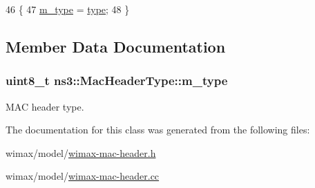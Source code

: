 \begin{DoxyCode}
46 \{
47   \hyperlink{classns3_1_1MacHeaderType_a20a811c2c0b8fa820f289ef3c578cb83}{m\_type} = \hyperlink{visualizer-ideas_8txt_add98db9e15e2a58cf2b57623e7aa893a}{type};
48 \}
\end{DoxyCode}


\subsection{Member Data Documentation}
\subsubsection[{\texorpdfstring{m\+\_\+type}{m_type}}]{\setlength{\rightskip}{0pt plus 5cm}uint8\+\_\+t ns3\+::\+Mac\+Header\+Type\+::m\+\_\+type\hspace{0.3cm}{\ttfamily [private]}}\hypertarget{classns3_1_1MacHeaderType_a20a811c2c0b8fa820f289ef3c578cb83}{}\label{classns3_1_1MacHeaderType_a20a811c2c0b8fa820f289ef3c578cb83}


M\+AC header type. 



The documentation for this class was generated from the following files\+:\begin{DoxyCompactItemize}
\item 
wimax/model/\hyperlink{wimax-mac-header_8h}{wimax-\/mac-\/header.\+h}\item 
wimax/model/\hyperlink{wimax-mac-header_8cc}{wimax-\/mac-\/header.\+cc}\end{DoxyCompactItemize}
